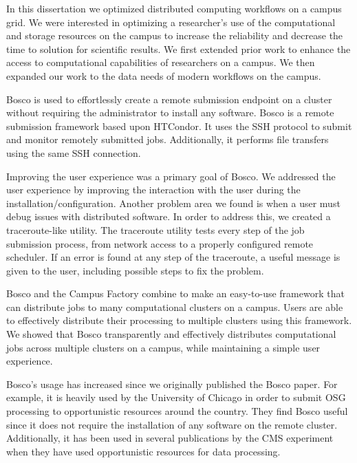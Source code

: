 \label{chapter:coordinatingstorage}

In this dissertation we optimized distributed computing workflows on a campus grid.  We were interested in optimizing a researcher's use of the computational and storage resources on the campus to increase the reliability and decrease the time to solution for scientific results.  We first extended prior work to enhance the access to computational capabilities of researchers on a campus.  We then expanded our work to the data needs of modern workflows on the campus.

Bosco is used to effortlessly create a remote submission endpoint on a cluster without requiring the administrator to install any software.  Bosco is a remote submission framework based upon HTCondor.  It uses the SSH protocol to submit and monitor remotely submitted jobs.  Additionally, it performs file transfers using the same SSH connection.

Improving the user experience was a primary goal of Bosco.  We addressed the user experience by improving the interaction with the user during the installation/configuration.  Another problem area we found is when a user must debug issues with distributed software.  In order to address this, we created a traceroute-like utility.  The traceroute utility tests every step of the job submission process, from network access to a properly configured remote scheduler.  If an error is found at any step of the traceroute, a useful message is given to the user, including possible steps to fix the problem.

Bosco and the Campus Factory combine to make an easy-to-use framework that can distribute jobs to many computational clusters on a campus.  Users are able to effectively distribute their processing to multiple clusters using this framework.  We showed that Bosco transparently and effectively distributes computational jobs across multiple clusters on a campus, while maintaining a simple user experience.

Bosco's usage has increased since we originally published the Bosco paper.  For example, it is heavily used by the University of Chicago in order to submit OSG processing to opportunistic resources around the country.  They find Bosco useful since it does not require the installation of any software on the remote cluster.  Additionally, it has been used in several publications by the CMS experiment when they have used opportunistic resources for data processing.

